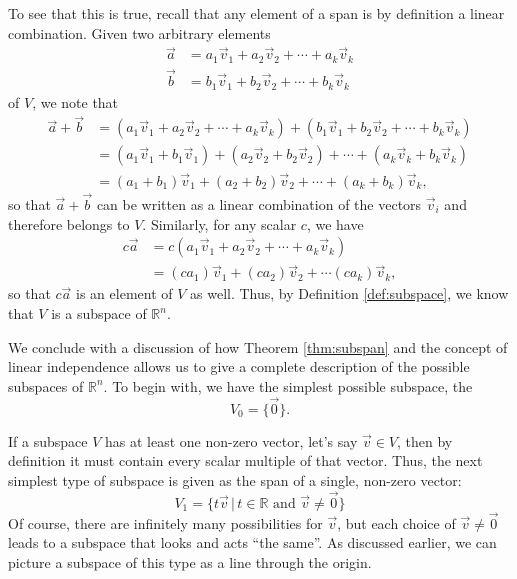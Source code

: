 \smallskip

To see that this is true, recall that any element of a span is by definition a linear combination. Given two arbitrary elements
\begin{align*}
\vec a & = a_1\vec{v}_1+a_2\vec{v}_2+\cdots + a_k\vec{v}_k\\
\vec b & = b_1\vec{v}_1+b_2\vec{v}_2+\cdots + b_k\vec{v}_k
\end{align*}
of $V$, we note that
\begin{align*}
\vec a + \vec b & = (a_1\vec{v}_1+a_2\vec{v}_2+\cdots + a_k\vec{v}_k) + (b_1\vec{v}_1+b_2\vec{v}_2+\cdots + b_k\vec{v}_k)\\
& = (a_1\vec{v}_1+b_1\vec{v}_1)+(a_2\vec{v}_2+b_2\vec{v}_2)+\cdots + (a_k\vec{v}_k+b_k\vec{v}_k)\\
& = (a_1+b_1)\vec{v}_1+(a_2+b_2)\vec{v}_2 + \cdots + (a_k+b_k)\vec{v}_k,
\end{align*}
so that $\vec a + \vec b$ can be written as a linear combination of the vectors $\vec{v}_i$ and therefore belongs to $V$. Similarly, for any scalar $c$, we have
\begin{align*}
c\vec a & = c(a_1\vec{v}_1+a_2\vec{v}_2+\cdots + a_k\vec{v}_k)\\
 & = (ca_1)\vec{v}_1+(ca_2)\vec{v}_2+\cdots (ca_k)\vec{v}_k,
\end{align*}
so that $c\vec a$ is an element of $V$ as well. Thus, by Definition \ref{def:subspace}, we know that $V$ is a subspace of $\mathbb{R}^n$.

\smallskip

We conclude with a discussion of how Theorem \ref{thm:subspan} and the concept of linear independence allows us to give a complete description of the possible subspaces of $\mathbb{R}^n$. To begin with, we have the simplest possible subspace, the  
\[
V_0 = \{\vec 0\}.
\]


If a subspace $V$ has at least one non-zero vector, let's say $\vec v\in V$, then by definition it must contain every scalar multiple of that vector. Thus, the next simplest type of subspace is given as the span of a single, non-zero vector:
\[
V_1 = \{t\vec v \, | \, t\in\mathbb{R} \text{ and } \vec v \neq \vec 0\}
\]
Of course, there are infinitely many possibilities for $\vec v$, but each choice of $\vec v\neq \vec 0$ leads to a subspace that looks and acts ``the same''. As discussed earlier, we can picture a subspace of this type as a line through the origin.

